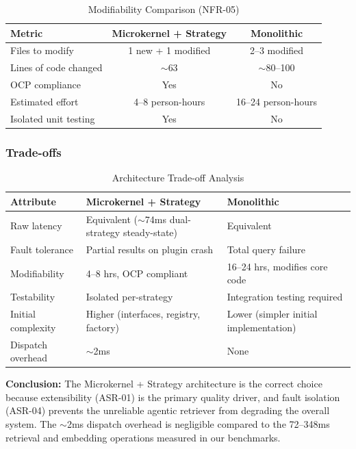 \documentclass[11pt,a4paper]{article}
\begin{document}
\begin{table}[H]
\centering
\begin{tabular}{lcc}
\toprule
\textbf{Metric} & \textbf{Microkernel + Strategy} & \textbf{Monolithic} \\
\midrule
Files to modify & 1 new + 1 modified & 2--3 modified \\
Lines of code changed & $\sim$63 & $\sim$80--100 \\
OCP compliance & Yes & No \\
Estimated effort & 4--8 person-hours & 16--24 person-hours \\
Isolated unit testing & Yes & No \\
\bottomrule
\end{tabular}
\caption{Modifiability Comparison (NFR-05)}
\end{table}

\subsubsection{Trade-offs}

\begin{table}[H]
\centering
\small
\begin{tabularx}{\textwidth}{lXX}
\toprule
\textbf{Attribute} & \textbf{Microkernel + Strategy} & \textbf{Monolithic} \\
\midrule
Raw latency & Equivalent ($\sim$74ms dual-strategy steady-state) & Equivalent \\
Fault tolerance & Partial results on plugin crash & Total query failure \\
Modifiability & 4--8 hrs, OCP compliant & 16--24 hrs, modifies core code \\
Testability & Isolated per-strategy & Integration testing required \\
Initial complexity & Higher (interfaces, registry, factory) & Lower (simpler initial implementation) \\
Dispatch overhead & $\sim$2ms & None \\
\bottomrule
\end{tabularx}
\caption{Architecture Trade-off Analysis}
\end{table}

\textbf{Conclusion:} The Microkernel + Strategy architecture is the correct choice because extensibility (ASR-01) is the primary quality driver, and fault isolation (ASR-04) prevents the unreliable agentic retriever from degrading the overall system. The $\sim$2ms dispatch overhead is negligible compared to the 72--348ms retrieval and embedding operations measured in our benchmarks.
\end{document}
